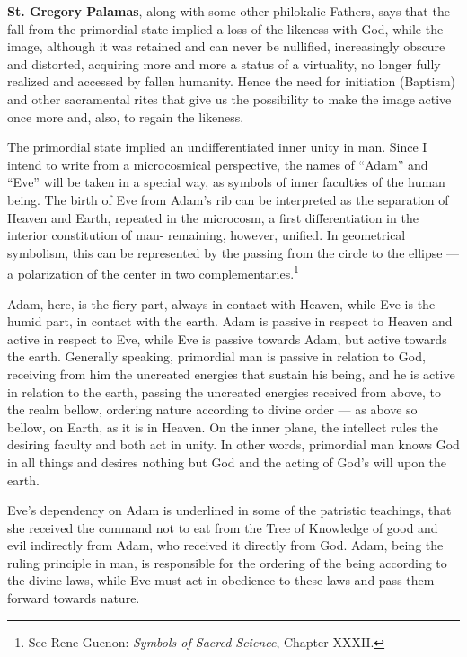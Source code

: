 \textbf{St. Gregory Palamas}, along with some other philokalic Fathers, says that the fall from the primordial state implied a loss of the likeness with God, while the image, although it was retained and can never be nullified, increasingly obscure and distorted, acquiring more and more a status of a virtuality, no longer fully realized and accessed by fallen humanity. Hence the need for initiation (Baptism) and other sacramental rites that give us the possibility to make the image active once more and, also, to regain the likeness.

The primordial state implied an undifferentiated inner unity in man. Since I intend to write from a microcosmical perspective, the names of ``Adam'' and ``Eve'' will be taken in a special way, as symbols of inner faculties of the human being. The birth of Eve from Adam's rib can be interpreted as the separation of Heaven and Earth, repeated in the microcosm, a first differentiation in the interior constitution of man- remaining, however, unified. In geometrical symbolism, this can be represented by the passing from the circle to the ellipse --- a polarization of the center in two complementaries.\footnote{See Rene Guenon: \textit{Symbols of Sacred Science}, Chapter XXXII.}

Adam, here, is the fiery part, always in contact with Heaven, while Eve is the humid part, in contact with the earth. Adam is passive in respect to Heaven and active in respect to Eve, while Eve is passive towards Adam, but active towards the earth. Generally speaking, primordial man is passive in relation to God, receiving from him the uncreated energies that sustain his being, and he is active in relation to the earth, passing the uncreated energies received from above, to the realm bellow, ordering nature according to divine order --- as above so bellow, on Earth, as it is in Heaven. On the inner plane, the intellect rules the desiring faculty and both act in unity. In other words, primordial man knows God in all things and desires nothing but God and the acting of God's will upon the earth.

Eve's dependency on Adam is underlined in some of the patristic teachings, that she received the command not to eat from the Tree of Knowledge of good and evil indirectly from Adam, who received it directly from God. Adam, being the ruling principle in man, is responsible for the ordering of the being according to the divine laws, while Eve must act in obedience to these laws and pass them forward towards nature.

